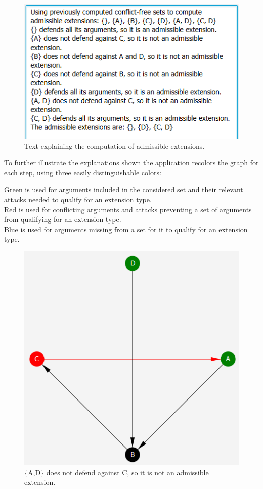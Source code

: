 \documentclass[draft,final]{vutinfth} %
\newcommand{\hl}{\par\vspace{6pt}} %
\begin{document}
\FloatBarrier
	\begin{figure}[!h]
		\centering
		\includegraphics{pics/explanation.png}
		\caption{Text explaining the computation of admissible extensions.}
	\end{figure}
\FloatBarrier

To further illustrate the explanations shown the application recolors the graph for each step, using three easily distinguishable colors:\hl
Green is used for arguments included in the considered set and their relevant attacks needed to qualify for an extension type.\\
Red is used for conflicting arguments and attacks preventing a set of arguments from qualifying for an extension type.\\
Blue is used for arguments missing from a set for it to qualify for an extension type.\hl

\FloatBarrier
	\begin{figure}[!h]
		\centering
		\includegraphics{pics/colored.png}
		\caption{\{A,D\} does not defend against C, so it is not an admissible extension.}
	\end{figure}
\FloatBarrier
\end{document}
